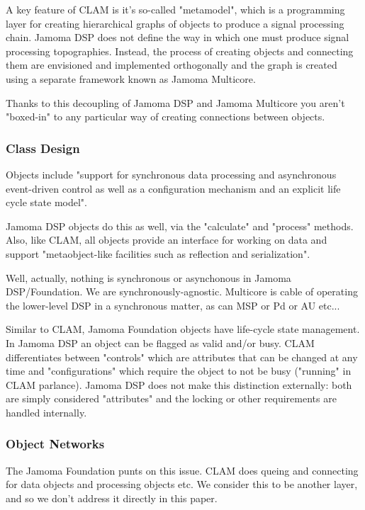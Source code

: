 \documentclass[twoside,10pt]{article}
\begin{document}
A key feature of CLAM is it's so-called "metamodel", which is a programming layer for creating hierarchical graphs of objects to produce a signal processing chain.  Jamoma DSP does not define the way in which one must produce signal processing topographies.  Instead, the process of creating objects and connecting them are envisioned and implemented orthogonally and the graph is created using a separate framework known as Jamoma Multicore.

Thanks to this decoupling of Jamoma DSP and Jamoma Multicore you aren't "boxed-in" to any particular way of creating connections between objects.

\subsubsection{Class Design}

Objects include "support for synchronous data processing and asynchronous event-driven control as well as a configuration mechanism and an explicit life cycle state model". 

Jamoma DSP objects do this as well, via the "calculate" and "process" methods.  Also, like CLAM, all objects provide an interface for working on data and support "metaobject-like facilities such as reflection and serialization".

Well, actually, nothing is synchronous or asynchonous in Jamoma DSP/Foundation.  We are synchronously-agnostic.  Multicore is cable of operating the lower-level DSP in a synchronous matter, as can MSP or Pd or AU etc...

Similar to CLAM, Jamoma Foundation objects have life-cycle state management.  In Jamoma DSP an object can be flagged as valid and/or busy.  CLAM differentiates between "controls" which are attributes that can be changed at any time and "configurations" which require the object to not be busy ("running" in CLAM parlance).  Jamoma DSP does not make this distinction externally: both are simply considered "attributes" and the locking or other requirements are handled internally. 



\subsubsection{Object Networks}

The Jamoma Foundation punts on this issue.  CLAM does queing and connecting for data objects and processing objects etc.  We consider this to be another layer, and so we don't address it directly in this paper.
\end{document}
